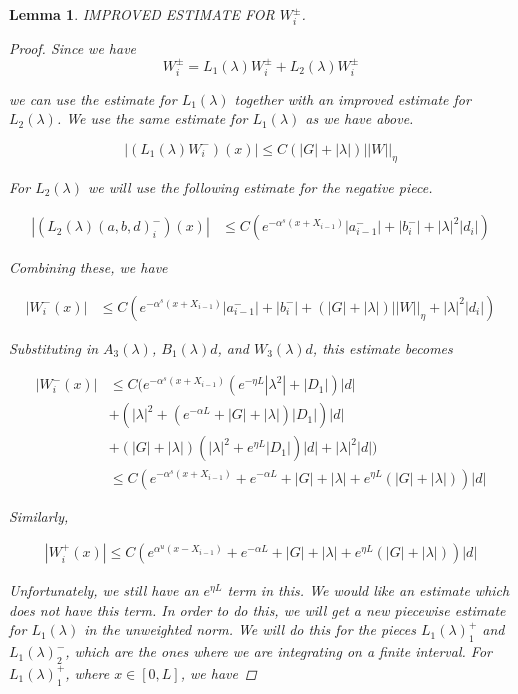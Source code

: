 \documentclass[12pt]{article}
\newtheorem{lemma}{Lemma}
\begin{document}
\begin{lemma}
IMPROVED ESTIMATE FOR $W_i^\pm$.
\begin{proof}
Since we have 
\[
W_i^\pm = L_1(\lambda)W_i^\pm + L_2(\lambda)W_i^\pm 
\]

we can use the estimate for $L_1(\lambda)$ together with an improved estimate for $L_2(\lambda)$. We use the same estimate for $L_1(\lambda)$ as we have above.

\[
| (L_1(\lambda) W_i^-)(x) | \leq C\left(|G| +|\lambda|\right)||W||_\eta
\]

For $L_2(\lambda)$ we will use the following estimate for the negative piece.

\begin{align*}
| (L_2(\lambda)(a, b, d)_i^-)(x)| &\leq C \left( e^{-\alpha^s(x + X_{i-1})} |a^-_{i-1}| + |b_i^-| + |\lambda|^2 |d_i| \right)
\end{align*}

Combining these, we have

\begin{align*}
| W_i^-(x)| &\leq C \left( e^{-\alpha^s(x + X_{i-1})} |a^-_{i-1}| + |b_i^-| + \left(|G| +|\lambda|\right)||W||_\eta + |\lambda|^2 |d_i| \right)
\end{align*}

Substituting in $A_3(\lambda)$, $B_1(\lambda)d$, and $W_3(\lambda)d$, this estimate becomes

\begin{align*}
| W_i^-(x)| &\leq C ( e^{-\alpha^s(x + X_{i-1})} \left( e^{-\eta L}|\lambda^2| + |D_1| \right)|d| \\
&+ (|\lambda|^2 + (e^{-\alpha L} + |G| + |\lambda|)|D_1| )|d| \\
&+ \left(|G| +|\lambda|\right)\left( |\lambda|^2 + e^{\eta L}|D_1|\right)|d| + |\lambda|^2 |d| )\\
&\leq C\left( e^{-\alpha^s(x + X_{i-1})} + e^{-\alpha L} + |G| + |\lambda| + e^{\eta L}(|G| + |\lambda|) \right)|d|
\end{align*}

Similarly,

\begin{align*}
| W_i^+(x)| \leq C\left( e^{\alpha^u(x - X_{i-1})} + e^{-\alpha L} + |G| + |\lambda| + e^{\eta L}(|G| + |\lambda|) \right)|d|
\end{align*}

Unfortunately, we still have an $e^{\eta L}$ term in this. We would like an estimate which does not have this term. In order to do this, we will get a new piecewise estimate for $L_1(\lambda)$ in the unweighted norm. We will do this for the pieces $L_1(\lambda)_1^+$ and $L_1(\lambda)_2^-$, which are the ones where we are integrating on a finite interval. For $L_1(\lambda)_1^+$, where $x \in [0, L]$, we have



\end{proof}
\end{lemma}
\end{document}
